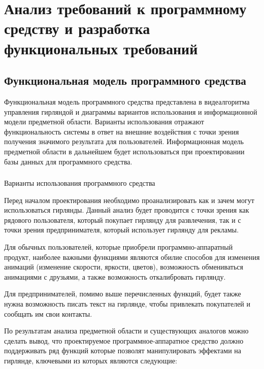\section{Анализ требований к программному средству и разработка функциональных требований}
\label{sec:domain}

\subsection{Функциональная модель программного средства}
\label{sec:domain:model}

Функциональная модель программного средства представлена в виде алгоритма управления гирляндой и диаграммы вариантов использования и информационной модели предметной области. Варианты использования отражают функциональность системы в ответ на внешние воздействия с точки зрения получения значимого результата для пользователей. Информационная модель предметной области в дальнейшем будет использоваться при проектировании базы данных для программного средства.

\subsubsection{ } Варианты использования программного средства
\label{sec:domain:model:use_cases}

Перед началом проектирования необходимо проанализировать как и зачем могут использоваться гирлянды. Данный анализ будет проводится с точки зрения как рядового пользователя, который покупает гирлянду для развлечения, так и с точки зрения предпринимателя, который использует гирлянду для рекламы.

Для обычных пользователей, которые приобрели программно-аппаратный продукт, наиболее важными функциями являются обилие способов для изменения анимаций (изменение скорости, яркости, цветов), возможность обмениваться анимациями с друзьями, а также возможность откалибровать гирлянду.

Для предпринимателей, помимо выше перечисленных функций, будет также нужна возможность писать текст на гирлянде, чтобы привлекать покупателей и сообщать им свои контакты.

По результатам анализа предметной области и существующих аналогов можно сделать вывод, что проектируемое программное-аппаратное средство должно поддерживать ряд функций которые позволят манипулировать эффектами на гирлянде, ключевыми из которых являются следующие:

